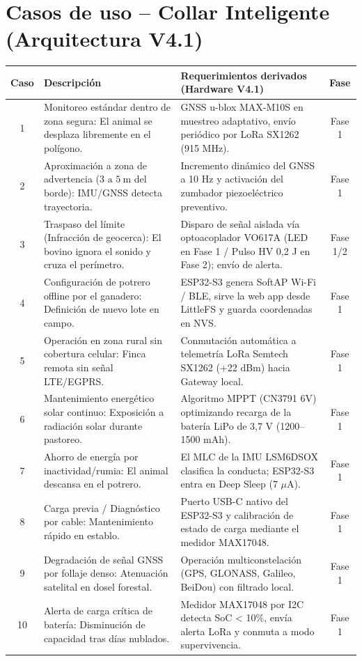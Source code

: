 \section*{Casos de uso -- Collar Inteligente (Arquitectura V4.1)}

\begin{table}[H]
\centering
\small
\begin{tabularx}{\textwidth}{|c X X c|}
\hline
\rowcolor{categorybg}
\textbf{Caso} & \textbf{Descripción} & \textbf{Requerimientos derivados (Hardware V4.1)} & \textbf{Fase} \\ \hline
1 & Monitoreo estándar dentro de zona segura: El animal se desplaza libremente en el polígono. & GNSS u-blox MAX-M10S en muestreo adaptativo, envío periódico por LoRa SX1262 (915 MHz). & Fase 1 \\ \hline
2 & Aproximación a zona de advertencia ($3\text{ a }5~\text{m}$ del borde): IMU/GNSS detecta trayectoria. & Incremento dinámico del GNSS a 10 Hz y activación del zumbador piezoeléctrico preventivo. & Fase 1 \\ \hline
3 & Traspaso del límite (Infracción de geocerca): El bovino ignora el sonido y cruza el perímetro. & Disparo de señal aislada vía optoacoplador VO617A (LED en Fase 1 / Pulso HV 0,2 J en Fase 2); envío de alerta. & Fase 1/2 \\ \hline
4 & Configuración de potrero offline por el ganadero: Definición de nuevo lote en campo. & ESP32-S3 genera SoftAP Wi-Fi / BLE, sirve la web app desde LittleFS y guarda coordenadas en NVS. & Fase 1 \\ \hline
5 & Operación en zona rural sin cobertura celular: Finca remota sin señal LTE/EGPRS. & Conmutación automática a telemetría LoRa Semtech SX1262 (+22 dBm) hacia Gateway local. & Fase 1 \\ \hline
\rowcolor{rowalt}
6 & Mantenimiento energético solar continuo: Exposición a radiación solar durante pastoreo. & Algoritmo MPPT (CN3791 6V) optimizando recarga de la batería LiPo de 3,7 V (1200--1500 mAh). & Fase 1 \\ \hline
7 & Ahorro de energía por inactividad/rumia: El animal descansa en el potrero. & El MLC de la IMU LSM6DSOX clasifica la conducta; ESP32-S3 entra en Deep Sleep (7 $\mu$A). & Fase 1 \\ \hline
8 & Carga previa / Diagnóstico por cable: Mantenimiento rápido en establo. & Puerto USB-C nativo del ESP32-S3 y calibración de estado de carga mediante el medidor MAX17048. & Fase 1 \\ \hline
9 & Degradación de señal GNSS por follaje denso: Atenuación satelital en dosel forestal. & Operación multiconstelación (GPS, GLONASS, Galileo, BeiDou) con filtrado local. & Fase 1 \\ \hline
10 & Alerta de carga crítica de batería: Disminución de capacidad tras días nublados. & Medidor MAX17048 por I2C detecta SoC < 10\%, envía alerta LoRa y conmuta a modo supervivencia. & Fase 1 \\ \hline
\end{tabularx}
\end{table}